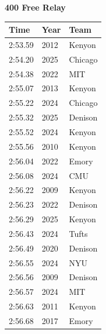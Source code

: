 \noindent\begin{minipage}[t]{0.98\textwidth}
\centering
\textbf{\textcolor{teamprimary}{400 Free Relay}}\par
\vspace{0.5em}
\centering
\small
\renewcommand{\arraystretch}{1.0}
\setlength{\tabcolsep}{4pt}
\begin{tabular}{@{}p{4.5cm}p{2.5cm}p{4.5cm}@{}}
\toprule
\textbf{Time} & \textbf{Year} & \textbf{Team} \\
\midrule
2:53.59 & 2012 & Kenyon \\
2:54.20 & 2025 & Chicago \\
2:54.38 & 2022 & MIT \\
2:55.07 & 2013 & Kenyon \\
2:55.22 & 2024 & Chicago \\
2:55.32 & 2025 & Denison \\
2:55.52 & 2024 & Kenyon \\
2:55.56 & 2010 & Kenyon \\
2:56.04 & 2022 & Emory \\
2:56.08 & 2024 & CMU \\
2:56.22 & 2009 & Kenyon \\
2:56.23 & 2022 & Denison \\
2:56.29 & 2025 & Kenyon \\
2:56.43 & 2024 & Tufts \\
2:56.49 & 2020 & Denison \\
2:56.55 & 2024 & NYU \\
2:56.56 & 2009 & Denison \\
2:56.57 & 2024 & MIT \\
2:56.63 & 2011 & Kenyon \\
2:56.68 & 2017 & Emory \\
\bottomrule
\end{tabular}
\end{minipage}
\vspace{1.2em}
